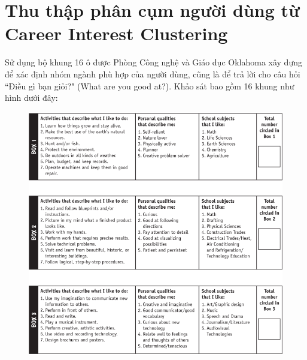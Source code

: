 \section{Thu thập phân cụm người dùng từ Career Interest Clustering} \label{3.3}
Sử dụng bộ khung 16 ô được Phòng Công nghệ và Giáo dục Oklahoma xây dựng để xác định nhóm ngành phù hợp của người dùng, cũng là để trả lời cho câu hỏi ``Điều gì bạn giỏi?" (What are you good at?). Khảo sát bao gồm 16 khung như hình dưới đây:

\begin{figure}[H]
    \centering
    \includegraphics[width=0.9\linewidth]{images/chap3/CC1.png}
\end{figure}

